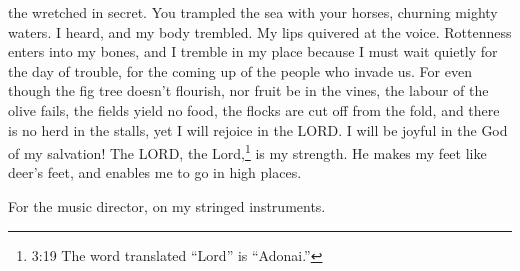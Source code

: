 the wretched in secret.  You trampled the sea with your
horses, churning mighty waters.  I heard, and my body
trembled. My lips quivered at the voice. Rottenness enters into my
bones, and I tremble in my place because I must wait quietly for the day
of trouble, for the coming up of the people who invade us. 
For even though the fig tree doesn't flourish, nor fruit be in the
vines, the labour of the olive fails, the fields yield no food, the
flocks are cut off from the fold, and there is no herd in the stalls,
 yet I will rejoice in the LORD. I will be joyful in the
God of my salvation!  The LORD, the Lord,\footnote{3:19 The
  word translated ``Lord'' is ``Adonai.''} is my strength. He makes my
feet like deer's feet, and enables me to go in high places.

For the music director, on my stringed instruments.
